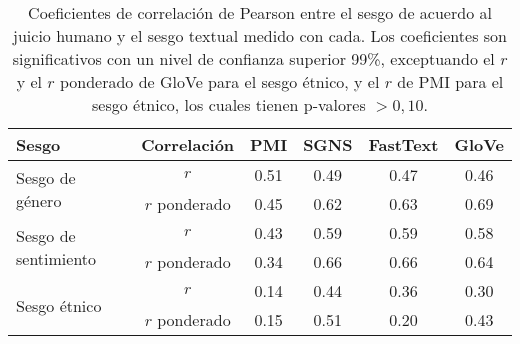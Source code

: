 

\begin{table}[h]
  \centering
  \begin{tabular}{lccccc}
    \toprule
    Sesgo                                    & Correlación   & PMI                & SGNS & FastText & GloVe              \\
    \midrule
    \multirow[c]{2}{*}{Sesgo de género}      & $r$           & 0.51               & 0.49 & 0.47     & 0.46               \\
                                             & $r$ ponderado & 0.45               & 0.62 & 0.63     & 0.69               \\
    \cline{1-6}
    \multirow[c]{2}{*}{Sesgo de sentimiento} & $r$           & 0.43               & 0.59 & 0.59     & 0.58               \\
                                             & $r$ ponderado & 0.34               & 0.66 & 0.66     & 0.64               \\
    \cline{1-6}
    \multirow[c]{2}{*}{Sesgo étnico}         & $r$           & {\color{gray}0.14} & 0.44 & 0.36     & {\color{gray}0.30} \\
                                             & $r$ ponderado & 0.15               & 0.51 & 0.20     & {\color{gray}0.43} \\
    \cline{1-6}
    \bottomrule
  \end{tabular}
  \caption{
    Coeficientes de correlación de Pearson entre el sesgo de acuerdo al juicio humano y el sesgo textual medido con cada. Los coeficientes son significativos con un nivel de confianza superior 99\%, exceptuando el $r$ y el $r$ ponderado de GloVe para el sesgo étnico, y el $r$ de PMI para el sesgo étnico, los cuales tienen p-valores $> 0,10$.
  }
  \label{tab:correlaciones}
\end{table}


